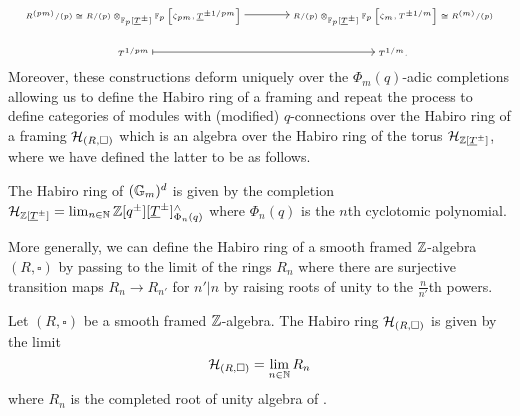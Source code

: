 \begin{equation}\label{eqn: gluing map Frobenius}
    \tiny
    \begin{tikzcd}
        {R^{(pm)}/(p)\cong R/(p)\otimes_{\FF_{p}[\underline{T}^{\pm}]}\FF_{p}\left[\zeta_{pm},\underline{T}^{\pm 1/pm}\right]} && {R/(p)\otimes_{\FF_{p}[\underline{T}^{\pm}]}\FF_{p}\left[\zeta_{m},T^{\pm 1/m}\right]\cong R^{(m)}/(p)} \\
        {T^{1/pm}} && {T^{1/m}.}
        \arrow[from=1-1, to=1-3]
        \arrow[maps to, from=2-1, to=2-3]
    \end{tikzcd}
    \normalsize
\end{equation}
Moreover, these constructions deform uniquely over the $\Phi_{m}(q)$-adic completions allowing us to define the Habiro ring of a framing and repeat the process to define categories of modules with (modified) $q$-connections over the Habiro ring of a framing $\mathcal{H}_{(R,\square)}$ which is an algebra over the Habiro ring of the torus $\mathcal{H}_{\mathbb{Z}[\underline{T}^{\pm}]}$, where we have defined the latter to be as follows. 
\begin{definition}\label{def: Habiro ring of base}
    The Habiro ring of $(\mathbb{G}_{m})^{d}$ is given by the completion $\mathcal{H}_{\mathbb{Z}[\underline{T}^{\pm}]}=\lim_{n\in\mathbb{N}}\mathbb{Z}[q^{\pm}][\underline{T}^{\pm}]^{\wedge}_{\Phi_{n}(q)}$ where $\Phi_{n}(q)$ is the $n$th cyclotomic polynomial. 
\end{definition}
More generally, we can define the Habiro ring of a smooth framed $\mathbb{Z}$-algebra $(R,\square)$ by passing to the limit of the rings $R_{n}$ where there are surjective transition maps $R_{n}\to R_{n'}$ for $n'|n$ by raising roots of unity to the $\frac{n}{n'}$th powers. 
\begin{definition}\label{def: Habiro ring of framed algebra}
    Let $(R,\square)$ be a smooth framed $\mathbb{Z}$-algebra. The Habiro ring $\mathcal{H}_{(R,\square)}$ is given by the limit 
    $$\mathcal{H}_{(R,\square)}=\lim_{n\in\mathbb{N}}R_{n}$$
    where $R_{n}$ is the completed root of unity algebra of . 
\end{definition}